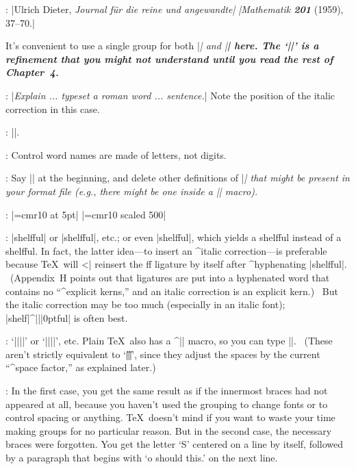 :
 |Ulrich Dieter, {\sl Journal f\"ur die reine und angewandte|\parbreak
        |Mathematik\/ \bf201} (1959), 37--70.|\par\nobreak\smallskip\noindent
It's convenient to use a single group for both |\sl| and |\bf| here. The
`|\/|' is a refinement that you might not understand until you read the
rest of Chapter~4.

:
 |{\it Explain ... typeset a\/ {\rm roman} word ... sentence.}|
Note the position of the italic correction in this case.

:
 |\def\ic#1{\setbox0=\hbox{#1\/}\dimen0=\wd0|\parbreak
|\setbox0=\hbox{#1}\advance\dimen0 by -\wd0}|.

:
 Control word names are made of letters, not digits.

:
 Say |\def\sl{\it}| at the beginning, and delete other definitions
of\/ |\sl| that might be present in your format file (e.g., there might be
one inside a |\tenpoint| macro).

:
 |\font\squinttenrm=cmr10 at 5pt|\parbreak
        |\font\squinttenrm=cmr10 scaled 500|

:
 |{shelf}ful| or |shelf{}ful|, etc.; or even |shelf\/ful|, which
yields a shelf\/ful instead of a shelf{}ful. In fact, the latter idea---to
insert an ^{italic correction}---is preferable because \TeX\ will ^^|\/|
reinsert the ff ligature by itself after ^{hyphenating} |shelf{}ful|. \
(Appendix~H points out that ligatures are put into a hyphenated word that
contains no ``^{explicit kerns},'' and an italic correction is an
explicit kern.) \ But the italic correction may be too much (especially in an
italic font); |shelf{|^|\kern||0pt}ful| is often best.

:
 `\]|{|\]|}|\]' or `\]|{}|\]|{}|\]', etc. Plain \TeX\ also has a
^|\space| macro, so you can type |\space\space\space|.  \ (These aren't
strictly equivalent to `|\|\]|\|\]|\|\]', since they adjust the spaces by
the current ``^{space factor},'' as explained later.)

:
 In the first case, you get the same result as if the innermost
braces had not appeared at all, because you haven't used the grouping to
change fonts or to control spacing or anything. \TeX\ doesn't mind if you
want to waste your time making groups for no particular reason.
But in the second case, the necessary braces were forgotten. You get the
letter `S' centered on a line by itself, followed by a paragraph that
begins with `o should this.' on the next line.

